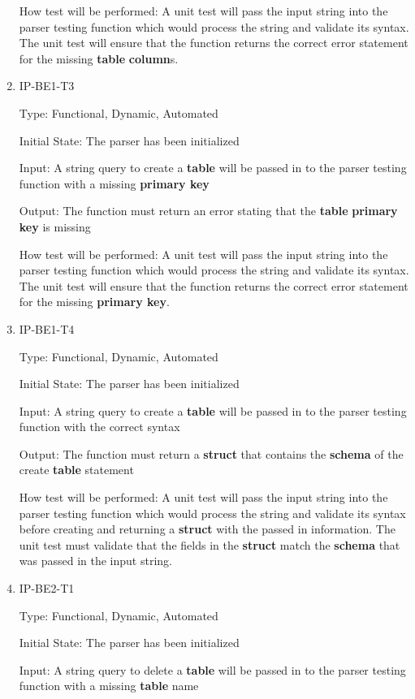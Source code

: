 \documentclass[12pt, titlepage]{article}
\begin{document}
\begin{enumerate}
How test will be performed: A unit test will pass the input string into the parser testing function which would process the string and validate its syntax. The unit test will ensure that the function returns the correct error statement for the missing \textbf{table} \textbf{column}s.

\item{IP-BE1-T3}

Type: Functional, Dynamic, Automated
					
Initial State: The parser has been initialized
					
Input: A string query to create a \textbf{table} will be passed in to the parser testing function with a missing \textbf{primary key}
					
Output: The function must return an error stating that the \textbf{table} \textbf{primary key} is missing
					
How test will be performed: A unit test will pass the input string into the parser testing function which would process the string and validate its syntax. The unit test will ensure that the function returns the correct error statement for the missing \textbf{primary key}.

\item{IP-BE1-T4}

Type: Functional, Dynamic, Automated
					
Initial State: The parser has been initialized
					
Input: A string query to create a \textbf{table} will be passed in to the parser testing function with the correct syntax
					
Output: The function must return a \textbf{struct} that contains the \textbf{schema} of the create \textbf{table} statement
					
How test will be performed: A unit test will pass the input string into the parser testing function which would process the string and validate its syntax before creating and returning a \textbf{struct} with the passed in information. The unit test must validate that the fields in the \textbf{struct} match the \textbf{schema} that was passed in the input string.

\item{IP-BE2-T1}

Type: Functional, Dynamic, Automated
					
Initial State: The parser has been initialized
					
Input: A string query to delete a \textbf{table} will be passed in to the parser testing function with a missing \textbf{table} name
					

\end{enumerate}
\end{document}
